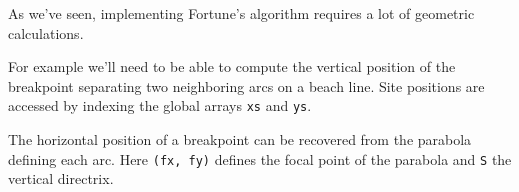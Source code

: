 \documentclass[
  letterpaper,
  DIV=11,
  numbers=noendperiod]{scrartcl}
\newenvironment{Shaded}{\begin{snugshade}}{\end{snugshade}}
\newcommand{\ControlFlowTok}[1]{\textcolor[rgb]{0.00,0.23,0.31}{#1}}
\newcommand{\DecValTok}[1]{\textcolor[rgb]{0.68,0.00,0.00}{#1}}
\newcommand{\FunctionTok}[1]{\textcolor[rgb]{0.28,0.35,0.67}{#1}}
\newcommand{\NormalTok}[1]{\textcolor[rgb]{0.00,0.23,0.31}{#1}}
\newcommand{\OtherTok}[1]{\textcolor[rgb]{0.00,0.23,0.31}{#1}}
\newcommand{\SpecialCharTok}[1]{\textcolor[rgb]{0.37,0.37,0.37}{#1}}
\newcommand{\StringTok}[1]{\textcolor[rgb]{0.13,0.47,0.30}{#1}}
\begin{document}
As we've seen, implementing Fortune's algorithm requires a lot of
geometric calculations.

For example we'll need to be able to compute the vertical position of
the breakpoint separating two neighboring arcs on a beach line. Site
positions are accessed by indexing the global arrays \texttt{xs} and
\texttt{ys}.

\begin{Shaded}
\end{Shaded}

The horizontal position of a breakpoint can be recovered from the
parabola defining each arc. Here \texttt{(fx,\ fy)} defines the focal
point of the parabola and \texttt{S} the vertical directrix.
\end{document}
